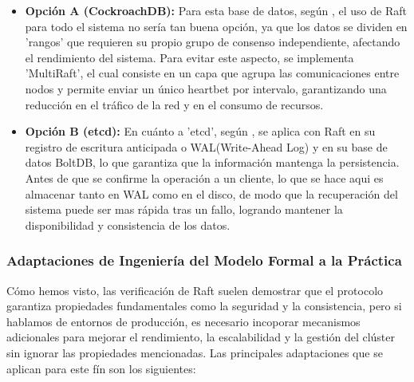 \documentclass[12pt,letterpaper]{article}
\begin{document}
\begin{itemize}
    \item \textbf{Opción A (CockroachDB):} Para esta base de datos, según \cite{cockroach2015}, el uso de Raft para todo el sistema no sería tan buena opción, ya que los datos se dividen en 'rangos' que requieren su propio grupo de consenso independiente, afectando el rendimiento del sistema. Para evitar este aspecto, se implementa 'MultiRaft', el cual consiste en un capa que agrupa las comunicaciones entre nodos y permite enviar un único heartbet por intervalo, garantizando una reducción en el tráfico de la red y en el consumo de recursos.

    \item \textbf{Opción B (etcd):} En cuánto a 'etcd', según \cite{lebow2025}, se aplica con Raft en su registro de escritura anticipada o WAL(Write-Ahead Log) y en su base de datos BoltDB, lo que garantiza que la información mantenga la persistencia. Antes de que se confirme la operación a un cliente, lo que se hace aqui es almacenar tanto en WAL como en el disco, de modo que la recuperación del sistema puede ser mas rápida tras un fallo, logrando mantener la disponibilidad y consistencia de los datos. 

\end{itemize}

\subsubsection{Adaptaciones de Ingeniería del Modelo Formal a la Práctica}
Cómo hemos visto, las verificación de Raft suelen demostrar que el protocolo garantiza propiedades fundamentales como la seguridad y la consistencia, pero si hablamos de entornos de producción, es necesario incoporar mecanismos adicionales para mejorar el rendimiento, la escalabilidad y la gestión del clúster sin ignorar las propiedades mencionadas. Las principales adaptaciones que se aplican para este fín son los siguientes:
\end{document}

